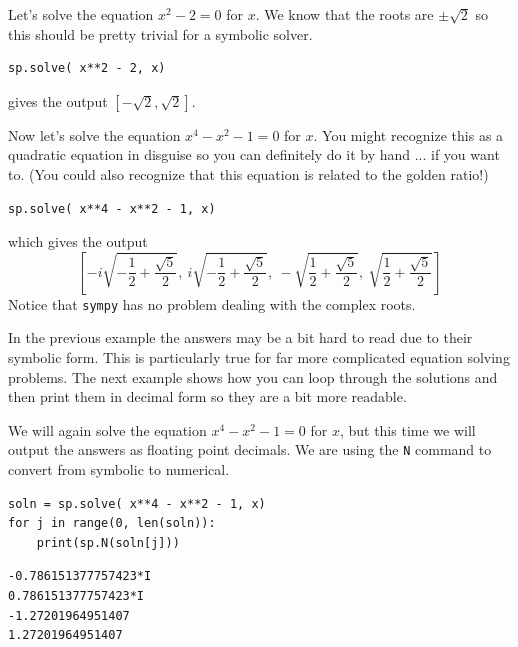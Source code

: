 \begin{example}
    Let's solve the equation $x^2 - 2 = 0$ for $x$.  We know that the roots are $\pm \sqrt{2}$ so this should be pretty trivial for a symbolic solver.

\bcode
\begin{lstlisting}
sp.solve( x**2 - 2, x)
\end{lstlisting}
gives the output
$\displaystyle \left[ -\sqrt{2}, \sqrt{2} \right]$.
\end{example}

\begin{example}
    Now let's solve the equation $x^4 - x^2 - 1= 0$ for $x$.  You might recognize this as
    a quadratic equation in disguise so you can definitely do it by hand ... if you want
    to.  (You could also recognize that this equation is related to the golden ratio!)

\bcode
\begin{lstlisting}
sp.solve( x**4 - x**2 - 1, x)
\end{lstlisting}
which gives the output
\[ \left[ - i \sqrt{- \frac{1}{2} + \frac{\sqrt{5}}{2}}, \  i \sqrt{- \frac{1}{2} + \frac{\sqrt{5}}{2}}, \  - \sqrt{\frac{1}{2} + \frac{\sqrt{5}}{2}}, \  \sqrt{\frac{1}{2} + \frac{\sqrt{5}}{2}}\right] \]
Notice that \texttt{sympy} has no problem dealing with the complex roots. 
\end{example}

In the previous example the answers may be a bit hard to read due to their symbolic form.
This is particularly true for far more complicated equation solving problems.  The next
example shows how you can loop through the solutions and then print them in decimal form
so they are a bit more readable.

\begin{example}
   We will again solve the equation   $x^4 - x^2 - 1= 0$ for $x$, but this time we will
   output the answers as floating point decimals.  We are using the \texttt{N} command to
   convert from symbolic to numerical.

\bcode
\begin{lstlisting}
soln = sp.solve( x**4 - x**2 - 1, x)
for j in range(0, len(soln)):
    print(sp.N(soln[j]))
\end{lstlisting}
\boutput
\begin{lstlisting}
-0.786151377757423*I
0.786151377757423*I
-1.27201964951407
1.27201964951407
\end{lstlisting}
\end{example}

